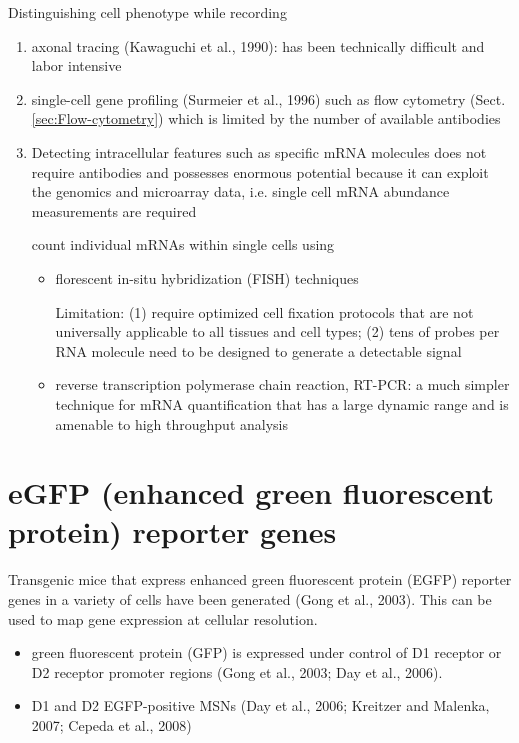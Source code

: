 Distinguishing cell phenotype while recording 
\begin{enumerate}
  \item axonal tracing (Kawaguchi et al., 1990): has been technically difficult
  and labor intensive
  
  \item single-cell gene profiling (Surmeier et al., 1996) such as flow
  cytometry (Sect.\ref{sec:Flow-cytometry}) which is limited by the number of
  available antibodies


  \item Detecting intracellular features such as specific mRNA molecules does not
require antibodies and  possesses enormous potential because it can exploit the
genomics and microarray data, i.e.  single cell mRNA abundance measurements are
required 
  
  count individual mRNAs within single cells using
  \begin{itemize}
    \item  florescent in-situ hybridization (FISH) techniques 
    
Limitation:   (1) require optimized cell fixation protocols that are not
universally applicable to all tissues and cell types; (2)  tens of probes per
RNA molecule need to be designed to generate a detectable signal
    
    \item reverse transcription polymerase chain reaction, RT-PCR: a
    much simpler technique for mRNA quantification that has a large dynamic
    range and is amenable to high throughput analysis 
  \end{itemize}  
\end{enumerate} 
 
\section{eGFP (enhanced green fluorescent protein) reporter genes}
\label{sec:EGFP}

Transgenic mice that express enhanced green fluorescent protein (EGFP) reporter
genes in a variety of cells have been generated (Gong et al., 2003).
This can be used to map gene expression at cellular resolution.
\begin{itemize}
  \item  green fluorescent protein (GFP) is expressed under control of D1
  receptor or D2 receptor promoter regions (Gong et al., 2003; Day et al.,
  2006).

  \item D1 and D2 EGFP-positive MSNs (Day et al., 2006;  Kreitzer and
  Malenka, 2007; Cepeda et al., 2008)

\end{itemize}


